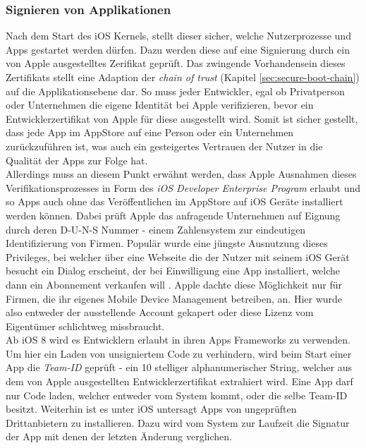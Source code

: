 	\subsubsection{Signieren von Applikationen}\label{sec:appsigning}
		Nach dem Start des iOS Kernels, stellt dieser sicher, welche Nutzerprozesse
		und Apps gestartet werden dürfen. Dazu werden diese auf eine Signierung durch
		ein von Apple ausgestelltes Zerifikat geprüft. Das zwingende Vorhandensein
		dieses Zertifikats stellt eine Adaption der \textsl{chain of trust} (Kapitel
		\ref{sec:secure-boot-chain}) auf die Applikationsebene dar. So muss jeder
		Entwickler, egal ob Privatperson oder Unternehmen die eigene Identität
		bei Apple verifizieren, bevor ein Entwicklerzertifikat von Apple für diese
		ausgestellt wird. Somit ist sicher gestellt, dass jede App im AppStore auf 
		eine Person oder ein Unternehmen zurückzuführen ist, was auch ein
		gesteigertes Vertrauen der Nutzer in die Qualität der Apps zur Folge hat.\\
		Allerdings muss an diesem Punkt erwähnt werden, dass Apple Ausnahmen dieses
		Verifikationsprozesses in Form des \textsl{iOS Developer Enterprise
		Program}\cite{AppleDevProg2015}
		erlaubt und so Apps auch ohne das Veröffentlichen im AppStore auf iOS Geräte
		installiert werden können. Dabei prüft Apple das anfragende Unternehmen auf
		Eignung durch deren D-U-N-S Nummer - einem Zahlensystem zur eindeutigen
		Identifizierung von Firmen. Populär wurde eine jüngste Ausnutzung dieses
		Privileges, bei welcher über eine Webseite die der Nutzer mit seinem iOS
		Gerät besucht ein Dialog erscheint, der bei Einwilligung eine App
		installiert, welche dann ein Abonnement verkaufen will
		\cite{HeiseCheatApp2015}. Apple dachte diese Möglichkeit nur für Firmen, die
		ihr eigenes Mobile Device Management betreiben, an. Hier wurde also entweder
		der ausstellende Account gekapert oder diese Lizenz vom Eigentümer
		schlichtweg missbraucht.\\
		Ab iOS 8 wird es Entwicklern erlaubt in ihren Apps Frameworks zu verwenden. Um
		hier ein Laden von unsigniertem Code zu verhindern, wird beim Start einer App
		die \textsl{Team-ID} geprüft - ein 10 stelliger alphanumerischer String,
		welcher aus dem von Apple ausgestellten Entwicklerzertifikat extrahiert wird.
		Eine App darf nur Code laden, welcher entweder vom System kommt, oder die selbe
		Team-ID besitzt. Weiterhin ist es unter iOS untersagt Apps von ungeprüften
		Drittanbietern zu installieren. Dazu wird vom System zur Laufzeit die
		Signatur der App mit denen der letzten Änderung verglichen.
		
